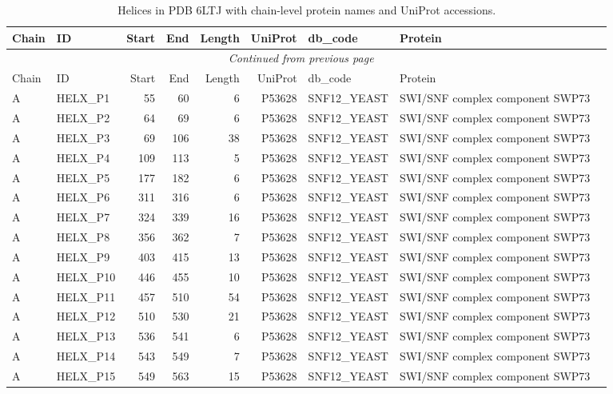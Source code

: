 \begin{longtable}{@{}llrrrrllp{5.2cm}@{}}
  \toprule
  Chain & ID & Start & End & Length & UniProt & db\_code & Protein \\
  \midrule
  \endfirsthead
  \multicolumn{8}{c}{\textit{Continued from previous page}} \\
  \toprule
  Chain & ID & Start & End & Length & UniProt & db\_code & Protein \\
  \midrule
  \endhead
  \bottomrule
  \endfoot
  \bottomrule
  \caption{Helices in PDB 6LTJ with chain-level protein names and UniProt accessions.}
  \label{tab:6ltj_helices_uniprot}
  \endlastfoot
  A & HELX_P1 & 55 & 60 & 6 & P53628 & SNF12_YEAST & SWI/SNF complex component SWP73 \\
  A & HELX_P2 & 64 & 69 & 6 & P53628 & SNF12_YEAST & SWI/SNF complex component SWP73 \\
  A & HELX_P3 & 69 & 106 & 38 & P53628 & SNF12_YEAST & SWI/SNF complex component SWP73 \\
  A & HELX_P4 & 109 & 113 & 5 & P53628 & SNF12_YEAST & SWI/SNF complex component SWP73 \\
  A & HELX_P5 & 177 & 182 & 6 & P53628 & SNF12_YEAST & SWI/SNF complex component SWP73 \\
  A & HELX_P6 & 311 & 316 & 6 & P53628 & SNF12_YEAST & SWI/SNF complex component SWP73 \\
  A & HELX_P7 & 324 & 339 & 16 & P53628 & SNF12_YEAST & SWI/SNF complex component SWP73 \\
  A & HELX_P8 & 356 & 362 & 7 & P53628 & SNF12_YEAST & SWI/SNF complex component SWP73 \\
  A & HELX_P9 & 403 & 415 & 13 & P53628 & SNF12_YEAST & SWI/SNF complex component SWP73 \\
  A & HELX_P10 & 446 & 455 & 10 & P53628 & SNF12_YEAST & SWI/SNF complex component SWP73 \\
  A & HELX_P11 & 457 & 510 & 54 & P53628 & SNF12_YEAST & SWI/SNF complex component SWP73 \\
  A & HELX_P12 & 510 & 530 & 21 & P53628 & SNF12_YEAST & SWI/SNF complex component SWP73 \\
  A & HELX_P13 & 536 & 541 & 6 & P53628 & SNF12_YEAST & SWI/SNF complex component SWP73 \\
  A & HELX_P14 & 543 & 549 & 7 & P53628 & SNF12_YEAST & SWI/SNF complex component SWP73 \\
  A & HELX_P15 & 549 & 563 & 15 & P53628 & SNF12_YEAST & SWI/SNF complex component SWP73 \\

\end{longtable}
